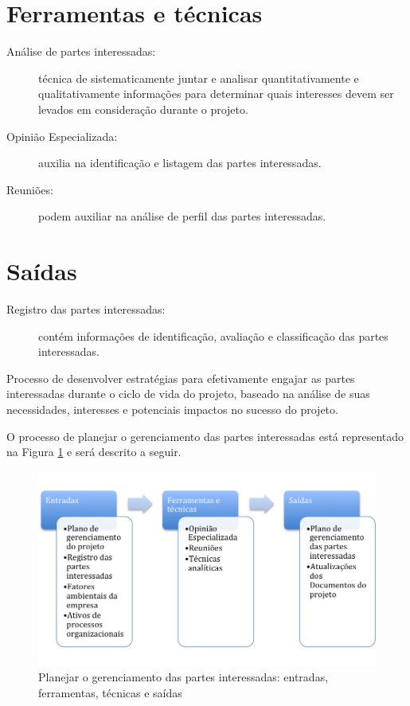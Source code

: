 \section{Ferramentas e técnicas}

\begin{description}
	
	\item[Análise de partes interessadas:] técnica de sistematicamente juntar e analisar quantitativamente e qualitativamente informações para determinar quais interesses devem ser levados em consideração durante o projeto.
	
	\item[Opinião Especializada:] auxilia na identificação e listagem das partes interessadas.
	
	\item[Reuniões:] podem auxiliar na análise de perfil das partes interessadas.

\end{description}

\section{Saídas}

\begin{description}

	\item[Registro das partes interessadas:] contém informações de identificação, avaliação e classificação das partes interessadas.
	
\end{description}


Processo de desenvolver estratégias para efetivamente engajar as partes interessadas durante o ciclo de vida do projeto, baseado na análise de suas necessidades, interesses e potenciais impactos no sucesso do projeto.

O processo de planejar o gerenciamento das partes interessadas está representado na Figura \ref{fig:sh:ger:efts} e será descrito a seguir.

\begin{figure}[!h]
	\centering
	\includegraphics[scale=0.5]{Figuras/stakeholders_efts_gerenciar.png}
	\caption{Planejar o gerenciamento das partes interessadas: entradas, ferramentas, técnicas e saídas}
	\label{fig:sh:ger:efts}
\end{figure}

